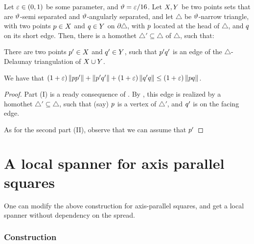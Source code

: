 \documentclass[12pt]{article}%
\begin{document}
\begin{lemma}
    Let $\varepsilon \in (0,1)$ be some parameter, and $\vartheta = \varepsilon/16$.
    Let $X,Y$ be two points sets that are $\vartheta$-semi separated
    and $\vartheta$-angularly separated, and let $\triangle$ be
    $\vartheta$-narrow triangle, with two points $p \in X$ and
    $q \in Y$ on $\partial \triangle$, with $p$ located at the
    head of $\triangle$, and $q$ on its short edge. Then, there is a
    homothet $\triangle' \subseteq \triangle$ of $\triangle$, such
    that:
    \begin{compactenumI}
        \item There are two points $p' \in X$ and $q' \in Y$,
        such that $p'q'$ is an edge of the $\triangle$-Delaunay
        triangulation of $X \cup Y$.

        \item We have that
        $(1+\varepsilon)\left\| p p' \right\| + \left\| p' q' \right\| + (1+\varepsilon)
        \left\| q' q \right\| \leq (1+\varepsilon) \left\| p q \right\|$.
    \end{compactenumI}
\end{lemma}
\begin{proof}
    Part (I) is a ready consequence of .  By
    , this edge is realized by a homothet
    $\triangle' \subseteq \triangle$, such that (say) $p$ is a
    vertex of $\triangle'$, and $q'$ is on the facing edge.


    As for the second part
    (II), observe that we can assume that $p'$
\end{proof}




\section{A local spanner for axis parallel squares}

One can modify the above construction for axis-parallel squares, and
get a local spanner without dependency on the spread.

\subsubsection{Construction}
\end{document}
